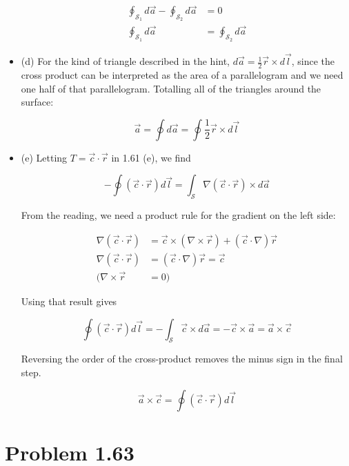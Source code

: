 \documentclass[10pt]{article}
\begin{document}
\begin{itemize}
\begin{align}
\oint_{\mathcal{S}_1} d\vec{a} - \oint_{\mathcal{S}_2} d\vec{a} &= 0 \\
\oint_{\mathcal{S}_1} d\vec{a} &= \oint_{\mathcal{S}_2} d\vec{a}
\end{align}

\item (d) For the kind of triangle described in the hint, $d\vec{a} = \frac{1}{2}\vec{r} \times d\vec{l}$, since the cross product can be interpreted as the area of a parallelogram and we need one half of that parallelogram.  Totalling all of the triangles around the surface:

\begin{equation}
\vec{a} = \oint d\vec{a} = \oint \frac{1}{2}\vec{r} \times d\vec{l}
\end{equation}

\item (e) Letting $T = \vec{c} \cdot \vec{r}$ in 1.61 (e), we find

\begin{equation}
- \oint (\vec{c} \cdot \vec{r}) d\vec{l} =  \int_{\mathcal{S}} \nabla (\vec{c} \cdot \vec{r}) \times d\vec{a}
\end{equation}

From the reading, we need a product rule for the gradient on the left side:

\begin{align}
\nabla (\vec{c} \cdot \vec{r}) &= \vec{c} \times (\nabla \times \vec{r}) + (\vec{c} \cdot \nabla)\vec{r} \\
\nabla (\vec{c} \cdot \vec{r}) &= (\vec{c} \cdot \nabla)\vec{r} = \vec{c} \\
(\nabla \times \vec{r} &= 0)
\end{align}

Using that result gives

\begin{equation}
\oint (\vec{c} \cdot \vec{r}) d\vec{l} =  -\int_{\mathcal{S}} \vec{c} \times d\vec{a} = - \vec{c} \times \vec{a} = \vec{a} \times \vec{c}
\end{equation}

Reversing the order of the cross-product removes the minus sign in the final step.

\begin{equation}
\vec{a} \times \vec{c} = \oint (\vec{c} \cdot \vec{r}) d\vec{l}
\end{equation}
\end{itemize}

\section{Problem 1.63}
\end{document}
